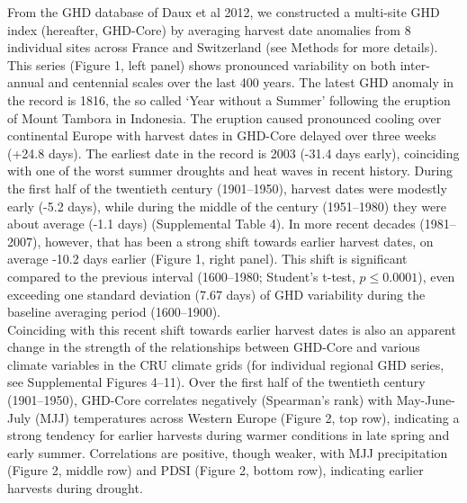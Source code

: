 \documentclass[final]{nature}
\begin{document}
\indent From the GHD database of Daux et al 2012\cite{Daux2012}, we constructed a multi-site GHD index (hereafter, GHD-Core) by averaging harvest date anomalies from 8 individual sites across France and Switzerland (see Methods for more details). This series (Figure 1, left panel) shows pronounced variability on both inter-annual and centennial scales over the last 400 years. The latest GHD anomaly in the record is 1816, the so called `Year without a Summer' following the eruption of Mount Tambora in Indonesia\cite{Luterbacher2015,Oppenheimer2003}. The eruption caused pronounced cooling over continental Europe with harvest dates in GHD-Core delayed over three weeks (+24.8 days). The earliest date in the record is 2003 (-31.4 days early), coinciding with one of the worst summer droughts and heat waves in recent history\cite{Rebetz2006}. During the first half of the twentieth century (1901--1950), harvest dates were modestly early (-5.2 days), while during the middle of the century (1951--1980) they were about average (-1.1 days) (Supplemental Table 4). In more recent decades (1981--2007), however, that has been a strong shift towards earlier harvest dates, on average -10.2 days earlier (Figure 1, right panel). This shift is significant compared to the previous interval (1600--1980; Student's t-test, $p\le0.0001$), even exceeding one standard deviation (7.67 days) of GHD variability during the baseline averaging period (1600--1900).\\
\indent Coinciding with this recent shift towards earlier harvest dates is also an apparent change in the strength of the relationships between GHD-Core and various climate variables in the CRU climate grids (for individual regional GHD series, see Supplemental Figures 4--11). Over the first half of the twentieth century (1901--1950), GHD-Core correlates negatively (Spearman's rank) with May-June-July (MJJ) temperatures across Western Europe (Figure 2, top row), indicating a strong tendency for earlier harvests during warmer conditions in late spring and early summer. Correlations are positive, though weaker, with MJJ precipitation (Figure 2, middle row) and PDSI (Figure 2, bottom row), indicating earlier harvests during drought.\\
\end{document}
